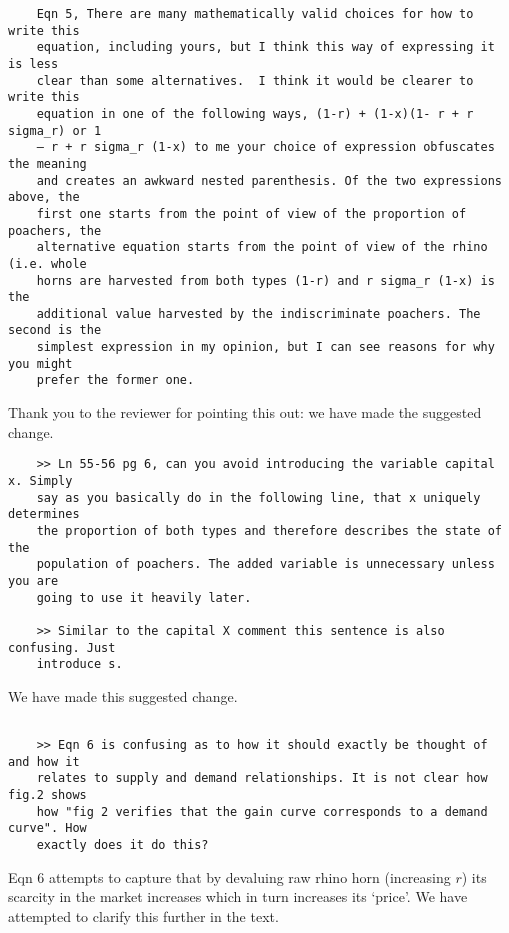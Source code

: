 \documentclass[10pt]{article}
\begin{document}
\begin{verbatim}
    Eqn 5, There are many mathematically valid choices for how to write this
    equation, including yours, but I think this way of expressing it is less
    clear than some alternatives.  I think it would be clearer to write this
    equation in one of the following ways, (1-r) + (1-x)(1- r + r sigma_r) or 1
    – r + r sigma_r (1-x) to me your choice of expression obfuscates the meaning
    and creates an awkward nested parenthesis. Of the two expressions above, the
    first one starts from the point of view of the proportion of poachers, the
    alternative equation starts from the point of view of the rhino (i.e. whole
    horns are harvested from both types (1-r) and r sigma_r (1-x) is the
    additional value harvested by the indiscriminate poachers. The second is the
    simplest expression in my opinion, but I can see reasons for why you might
    prefer the former one.
\end{verbatim}

Thank you to the reviewer for pointing this out: we have made the suggested
change.

\begin{verbatim}
    >> Ln 55-56 pg 6, can you avoid introducing the variable capital x. Simply
    say as you basically do in the following line, that x uniquely determines
    the proportion of both types and therefore describes the state of the
    population of poachers. The added variable is unnecessary unless you are
    going to use it heavily later.

    >> Similar to the capital X comment this sentence is also confusing. Just
    introduce s.

\end{verbatim}

We have made this suggested change.

\begin{verbatim}

    >> Eqn 6 is confusing as to how it should exactly be thought of and how it
    relates to supply and demand relationships. It is not clear how fig.2 shows
    how "fig 2 verifies that the gain curve corresponds to a demand curve". How
    exactly does it do this?
\end{verbatim}

Eqn 6 attempts to capture that by devaluing raw rhino horn (increasing \(r\))
its scarcity in the market increases which in turn increases its `price'.
We have attempted to clarify this further in the text.
\end{document}
